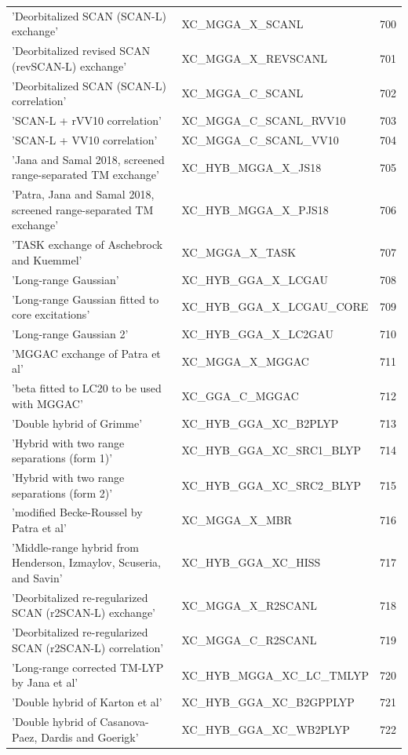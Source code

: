 \documentclass[final,12pt]{article}
\begin{document}
{{{{{{\begin{table}[!h]
\begin{center}
\begin{tabular}{llr}
  'Deorbitalized SCAN (SCAN-L) exchange' & XC\_MGGA\_X\_SCANL  &700\\
  'Deorbitalized revised SCAN (revSCAN-L) exchange' & XC\_MGGA\_X\_REVSCANL  &701\\
  'Deorbitalized SCAN (SCAN-L) correlation' & XC\_MGGA\_C\_SCANL  &702\\
  'SCAN-L + rVV10 correlation' & XC\_MGGA\_C\_SCANL\_RVV10  &703\\
  'SCAN-L + VV10 correlation' & XC\_MGGA\_C\_SCANL\_VV10  &704\\
  'Jana and Samal 2018, screened range-separated TM exchange' & XC\_HYB\_MGGA\_X\_JS18  &705\\
  'Patra, Jana and Samal 2018, screened range-separated TM exchange' & XC\_HYB\_MGGA\_X\_PJS18  &706\\
  'TASK exchange of Aschebrock and Kuemmel' & XC\_MGGA\_X\_TASK  &707\\
  'Long-range Gaussian' & XC\_HYB\_GGA\_X\_LCGAU  &708\\
  'Long-range Gaussian fitted to core excitations' & XC\_HYB\_GGA\_X\_LCGAU\_CORE  &709\\
  'Long-range Gaussian 2' & XC\_HYB\_GGA\_X\_LC2GAU  &710\\
  'MGGAC exchange of Patra et al' & XC\_MGGA\_X\_MGGAC  &711\\
  'beta fitted to LC20 to be used with MGGAC' & XC\_GGA\_C\_MGGAC  &712\\
  'Double hybrid of Grimme' & XC\_HYB\_GGA\_XC\_B2PLYP  &713\\
  'Hybrid with two range separations (form 1)' & XC\_HYB\_GGA\_XC\_SRC1\_BLYP  &714\\
  'Hybrid with two range separations (form 2)' & XC\_HYB\_GGA\_XC\_SRC2\_BLYP  &715\\
  'modified Becke-Roussel by Patra et al' & XC\_MGGA\_X\_MBR  &716\\
  'Middle-range hybrid from Henderson, Izmaylov, Scuseria, and Savin' & XC\_HYB\_GGA\_XC\_HISS  &717\\
  'Deorbitalized re-regularized SCAN (r2SCAN-L) exchange' & XC\_MGGA\_X\_R2SCANL  &718\\
  'Deorbitalized re-regularized SCAN (r2SCAN-L) correlation' & XC\_MGGA\_C\_R2SCANL  &719\\
  'Long-range corrected TM-LYP by Jana et al' & XC\_HYB\_MGGA\_XC\_LC\_TMLYP  &720\\
  'Double hybrid of Karton et al' & XC\_HYB\_GGA\_XC\_B2GPPLYP  &721\\
  'Double hybrid of Casanova-Paez, Dardis and Goerigk' & XC\_HYB\_GGA\_XC\_WB2PLYP  &722\\

\end{tabular}
\end{center}
\end{table}}}}}}}
\end{document}
